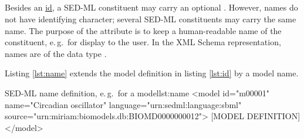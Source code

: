 \subsection{}
\label{sec:name}
%

Besides an \hyperref[sec:id]{id}, a SED-ML constituent may carry an optional . However, names do not have identifying character;  several SED-ML constituents may carry the same name. The purpose of the  attribute is to keep a human-readable name of the constituent, e.\,g.\ for display to the user. In the XML Schema representation, names are of the data type .

Listing \ref{lst:name} extends the model definition in listing \ref{lst:id} by a model name.
%
\begin{myXmlLst}{SED-ML name definition, e.\,g.\ for a model}{lst:name}
<model id="m00001" name="Circadian oscillator" language="urn:sedml:language:sbml" source="urn:miriam:biomodels.db:BIOMD0000000012">
 [MODEL DEFINITION]
</model>
\end{myXmlLst}
%

